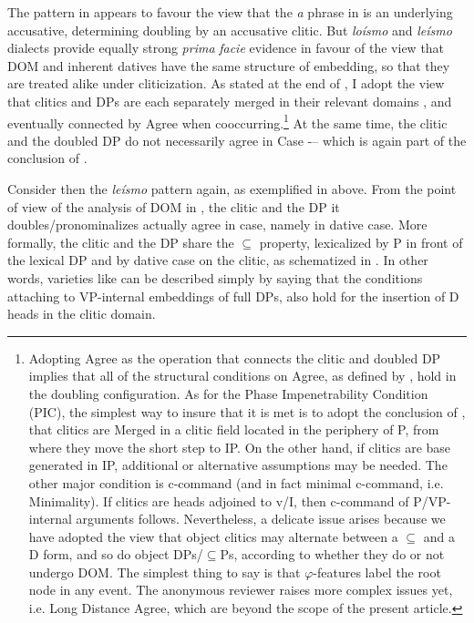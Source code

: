 \documentclass[output=paper,colorlinks,citecolor=brown,nonflat]{./langscibook}
\begin{document}
The pattern in  appears to favour the view that the \textit{a} phrase in  is an underlying accusative, determining doubling by an accusative clitic. But \textit{loísmo} and \textit{leísmo} dialects provide equally strong \textit{prima} \textit{facie} evidence in favour of the view that DOM and inherent datives have the same structure of embedding, so that they are treated alike under cliticization. As stated at the end of , I adopt the view that clitics and DPs are each separately merged in their relevant domains \citep{Sportiche1996}, and eventually connected by  Agree when cooccurring.\footnote{Adopting Agree as the operation that connects the clitic and doubled DP implies that all of the structural conditions on Agree, as defined by \citet{Chomsky2000}, hold in the doubling configuration. As for the Phase Impenetrability Condition (PIC), the simplest way to insure that it is met is to adopt the conclusion of \citet{Sportiche1996}, that clitics are Merged in a clitic field located in the periphery of \liv P, from where they move the short step to IP. On the other hand, if clitics are base generated in IP, additional or alternative assumptions may be needed. The other major condition is c-command (and in fact minimal c-command, i.e. Minimality). If clitics are heads adjoined to v/I, then c-command of \liv P/VP-internal arguments follows. Nevertheless, a delicate issue arises because we have adopted the view that object clitics may alternate between a \textrm{${\subseteq}$} and a D form, and so do object DPs/\textrm{${\subseteq}$}Ps, according to whether they do or not undergo DOM.  The simplest thing to say is that $\varphi $-features label the root node in any event. The anonymous reviewer raises more complex issues yet, i.e. Long Distance Agree, which are beyond the scope of the present article.}{} At the same time, the clitic and the doubled DP do not necessarily agree in Case -– which is again part of the conclusion of . 

Consider then the \textit{leísmo} pattern again, as exemplified in  above. From the point of view of the analysis of DOM in , the clitic and the DP it doubles/pronominalizes actually agree in case, namely in dative case. More formally, the clitic and the DP share the ${\subseteq}$ property, lexicalized by P in front of the lexical DP and by dative case on the clitic, as schematized in . In other words, varieties like  can be described simply by saying that the conditions attaching to VP-internal embeddings of full DPs, also hold for the insertion of D heads in the clitic domain.  
\end{document}
